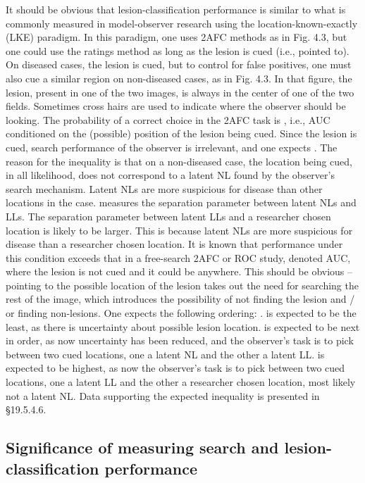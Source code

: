 \documentclass[
]{book}
\begin{document}
It should be obvious that lesion-classification performance is similar to what is commonly measured in model-observer research using the location-known-exactly (LKE) paradigm. In this paradigm, one uses 2AFC methods as in Fig. 4.3, but one could use the ratings method as long as the lesion is cued (i.e., pointed to). On diseased cases, the lesion is cued, but to control for false positives, one must also cue a similar region on non-diseased cases, as in Fig. 4.3. In that figure, the lesion, present in one of the two images, is always in the center of one of the two fields. Sometimes cross hairs are used to indicate where the observer should be looking. The probability of a correct choice in the 2AFC task is , i.e., AUC conditioned on the (possible) position of the lesion being cued. Since the lesion is cued, search performance of the observer is irrelevant, and one expects . The reason for the inequality is that on a non-diseased case, the location being cued, in all likelihood, does not correspond to a latent NL found by the observer's search mechanism. Latent NLs are more suspicious for disease than other locations in the case. measures the separation parameter between latent NLs and LLs. The separation parameter between latent LLs and a researcher chosen location is likely to be larger. This is because latent NLs are more suspicious for disease than a researcher chosen location. It is known that performance under this condition exceeds that in a free-search 2AFC or ROC study, denoted AUC, where the lesion is not cued and it could be anywhere. This should be obvious -- pointing to the possible location of the lesion takes out the need for searching the rest of the image, which introduces the possibility of not finding the lesion and / or finding non-lesions. One expects the following ordering: . is expected to be the least, as there is uncertainty about possible lesion location. is expected to be next in order, as now uncertainty has been reduced, and the observer's task is to pick between two cued locations, one a latent NL and the other a latent LL. is expected to be highest, as now the observer's task is to pick between two cued locations, one a latent LL and the other a researcher chosen location, most likely not a latent NL. Data supporting the expected inequality is presented in §19.5.4.6.

\hypertarget{rsm-sc-search-classification-significance}{%
\subsection{Significance of measuring search and lesion-classification performance}\label{rsm-sc-search-classification-significance}}
\end{document}
